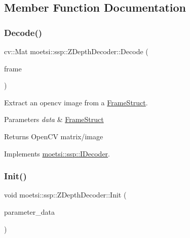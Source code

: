 \subsection{Member Function Documentation}
\mbox{\label{classmoetsi_1_1ssp_1_1ZDepthDecoder_a43226095658d616f7e38df1d43c2f88a}} 
\subsubsection{\texorpdfstring{Decode()}{Decode()}}
{\footnotesize\ttfamily cv\+::\+Mat moetsi\+::ssp\+::\+Z\+Depth\+Decoder\+::\+Decode (\begin{DoxyParamCaption}\item[{\hyperlink{structmoetsi_1_1ssp_1_1FrameStruct}{Frame\+Struct} \&}]{frame }\end{DoxyParamCaption})\hspace{0.3cm}{\ttfamily [virtual]}}



Extract an opencv image from a \hyperlink{structmoetsi_1_1ssp_1_1FrameStruct}{Frame\+Struct}. 


\begin{DoxyParams}{Parameters}
{\em data} & \hyperlink{structmoetsi_1_1ssp_1_1FrameStruct}{Frame\+Struct} \\
\hline
\end{DoxyParams}
\begin{DoxyReturn}{Returns}
Open\+CV matrix/image 
\end{DoxyReturn}


Implements \hyperlink{classmoetsi_1_1ssp_1_1IDecoder_a1c06604dc4107d3668a4e791c13cc063}{moetsi\+::ssp\+::\+I\+Decoder}.

\mbox{\label{classmoetsi_1_1ssp_1_1ZDepthDecoder_aad7fe4789b709fc3496a1837a8ff86e5}} 
\subsubsection{\texorpdfstring{Init()}{Init()}}
{\footnotesize\ttfamily void moetsi\+::ssp\+::\+Z\+Depth\+Decoder\+::\+Init (\begin{DoxyParamCaption}\item[{std\+::vector$<$ unsigned char $>$}]{parameter\+\_\+data }\end{DoxyParamCaption})}




